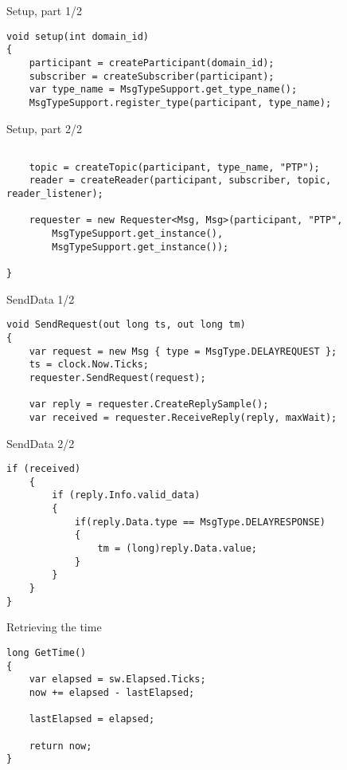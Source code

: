 \documentclass[compressed, presentation, notheorems, 12pt]{beamer}
\begin{document}
	\begin{frame}[containsverbatim]{Setup, part 1/2}
	\begin{lstlisting}[style=Code-C++]
void setup(int domain_id)
{
	participant = createParticipant(domain_id);
	subscriber = createSubscriber(participant);		
	var type_name = MsgTypeSupport.get_type_name();
	MsgTypeSupport.register_type(participant, type_name);

	\end{lstlisting}
	\end{frame}


	\begin{frame}[containsverbatim]{Setup, part 2/2}
	\begin{lstlisting}[style=Code-C++]

	topic = createTopic(participant, type_name, "PTP");
	reader = createReader(participant, subscriber, topic, reader_listener);

	requester = new Requester<Msg, Msg>(participant, "PTP",
		MsgTypeSupport.get_instance(),
		MsgTypeSupport.get_instance());

}
	\end{lstlisting}
	\end{frame}




	\begin{frame}[containsverbatim]{SendData 1/2}
	\begin{lstlisting}[style=Code-C++]
void SendRequest(out long ts, out long tm)
{
	var request = new Msg { type = MsgType.DELAYREQUEST };
	ts = clock.Now.Ticks;
	requester.SendRequest(request);

	var reply = requester.CreateReplySample();
	var received = requester.ReceiveReply(reply, maxWait);

	\end{lstlisting}
	\end{frame}



	\begin{frame}[containsverbatim]{SendData 2/2}
	\begin{lstlisting}[style=Code-C++]
	if (received)
	{
		if (reply.Info.valid_data)
		{
			if(reply.Data.type == MsgType.DELAYRESPONSE)
			{
				tm = (long)reply.Data.value;
			}
		}
	}
}
	\end{lstlisting}
	\end{frame}


	\begin{frame}[containsverbatim]{Retrieving the time}
	\begin{lstlisting}[style=Code-C++]
long GetTime()
{
	var elapsed = sw.Elapsed.Ticks;
	now += elapsed - lastElapsed;

	lastElapsed = elapsed;

	return now;
}
	\end{lstlisting}
	\end{frame}
\end{document}
